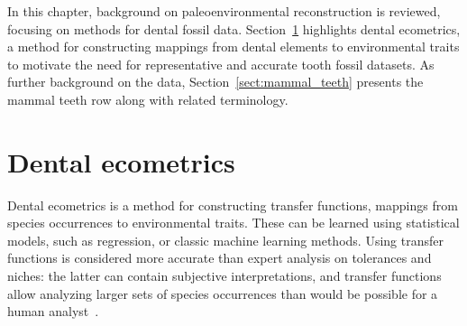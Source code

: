 \documentclass[english,twoside,openright]{UH_DS_MSc}
\begin{document}
In this chapter, background on paleoenvironmental reconstruction is reviewed, focusing on methods for dental fossil data.
Section~\ref{sect:ecometrics} highlights dental ecometrics, a method for constructing mappings from dental elements to environmental traits to motivate the 
need for representative and accurate tooth fossil datasets. As further background on the data, Section~\ref{sect:mammal_teeth} presents the mammal teeth 
row along with related terminology.

\section{Dental ecometrics}
\label{sect:ecometrics}

Dental ecometrics is a method for constructing transfer functions, mappings from species occurrences to environmental traits.
These can be learned using statistical models, such as regression, or classic machine learning methods.
Using transfer functions is considered more accurate than expert analysis on tolerances and niches: the latter
can contain subjective interpretations, and transfer functions allow analyzing larger sets of species occurrences than would 
 be possible for a human analyst~\cite{Faith_Lyman_2019_ch9}.
\end{document}
